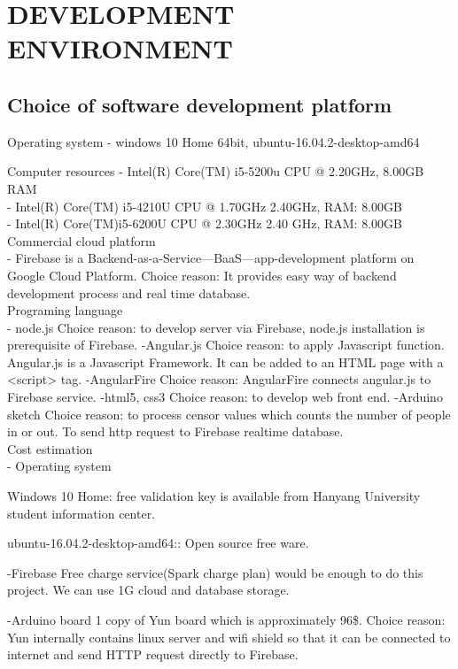 \documentclass[journal]{IEEEtran}
\begin{document}

\section{DEVELOPMENT ENVIRONMENT}

\subsection{Choice of software development platform}
Operating system
- windows 10 Home 64bit, ubuntu-16.04.2-desktop-amd64

Computer resources
- Intel(R) Core(TM) i5-5200u CPU @ 2.20GHz, 8.00GB RAM\\
- Intel(R) Core(TM) i5-4210U CPU @ 1.70GHz 2.40GHz,  RAM: 8.00GB\\
- Intel(R) Core(TM)i5-6200U CPU @ 2.30GHz 2.40 GHz, RAM: 8.00GB\\

Commercial cloud platform\\
- Firebase is a Backend-as-a-Service—BaaS—app-development platform on Google Cloud Platform.
Choice reason: It provides easy way of backend development process and real time database.\\


Programing language\\
- node.js 
Choice reason: to develop server via Firebase, node.js installation is prerequisite of Firebase.
-Angular.js
Choice reason: to apply Javascript function. Angular.js is  a Javascript Framework. It can be added to an HTML page with a <script> tag.
-AngularFire 
Choice reason: AngularFire connects angular.js to Firebase service.
-html5, css3
Choice reason: to develop web front end.
-Arduino sketch
Choice reason: to process censor values which counts the number of people in or out. To send http request to Firebase realtime database.\\

Cost estimation\\
- Operating system

Windows 10 Home: free validation key is available from Hanyang University student information center.

ubuntu-16.04.2-desktop-amd64:: Open source free ware.

-Firebase
Free charge service(Spark charge plan) would be enough to do this project. We can use 1G cloud and database storage.

-Arduino board
1 copy of Yun board which is approximately 96\$. 
Choice reason: Yun internally contains linux server and wifi shield so that it can be connected to internet and send HTTP request directly to Firebase.
\end{document}
